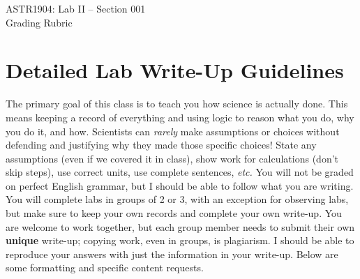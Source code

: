 \documentclass[10pt]{article}
\begin{document}
\begin{center}
\LARGE{ASTR1904: Lab II -- Section 001} \\ \medskip \Large{Grading Rubric}\\ 
\end{center}

\section*{Detailed Lab Write-Up Guidelines}

The primary goal of this class is to teach you how science is actually done. This means keeping a record of everything and using logic to reason what you do, why you do it, and how. Scientists can \textit{rarely} make assumptions or choices without defending and justifying why they made those specific choices! State any assumptions (even if we covered it in class), show work for calculations (don't skip steps), use correct units, use complete sentences, \textit{etc.} You will not be graded on perfect English grammar, but I should be able to follow what you are writing. \\ 

You will complete labs in groups of 2 or 3, with an exception for observing labs, but make sure to keep your own records and complete your own write-up. You are welcome to work together, but each group member needs to submit their own \textbf{unique} write-up; copying work, even in groups, is plagiarism. I should be able to reproduce your answers with just the information in your write-up. Below are some formatting and specific content requests. \\
\end{document}
